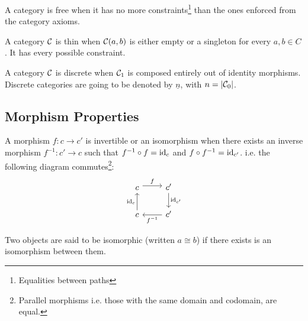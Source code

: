 \begin{definition}
  A category is free when it has no more constraints\footnote{Equalities
  between paths} than the ones enforced from the category axioms.
  \parencite{adamek_herrlich_strecker:joy_cats}
\end{definition}

\begin{definition}
  A category $\mathcal{C}$ is thin when $\mathcal{C}(a, b)$ is either empty or a singleton for
  every $a,b\in C$. \parencite{adamek_herrlich_strecker:joy_cats} It has every
  possible constraint.
\end{definition}

\begin{definition}
  A category $\mathcal{C}$ is discrete when $\mathcal{C}_1$ is composed entirely out of identity
  morphisms. \parencite{awodey:category_theory} Discrete categories are going to
  be denoted by $\underline{n}$, with $n=|\mathcal{C}_0|$.
\end{definition}

\subsection{Morphism Properties}

\begin{definition}
  A morphism $f: c\to c'$ is invertible or an isomorphism when there exists an
  inverse morphism $f^{-1}:c'\to c$ such that $f^{-1}\circ f = \mathrm{id}_{c}$ and
  $f\circ f^{-1} = \mathrm{id}_{c'}$. \parencite{lane:working_mathematician} i.e. the
  following diagram commutes\footnote{Parallel morphisms i.e. those with the
  same domain and codomain, are equal.}:
  \[\begin{tikzcd}
    c & {c'} \\
    c & {c'}
    \arrow["f", shift left=1, from=1-1, to=1-2]
    \arrow["{f^{-1}}", from=2-2, to=2-1]
    \arrow["{\mathrm{id}_c}", from=2-1, to=1-1]
    \arrow["{\mathrm{id}_{c'}}", from=1-2, to=2-2]
  \end{tikzcd}\]
\end{definition}

\begin{remark}
  Two objects are said to be isomorphic (written $a\cong b$) if there exists is
  an isomorphism between them.
\end{remark}

